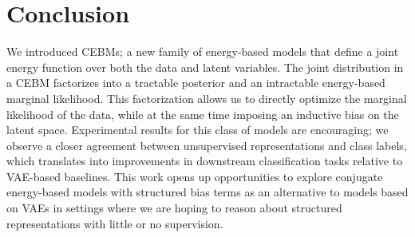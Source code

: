\documentclass{article}
\begin{document}
\section{Conclusion}
\label{sec:conclusion}


We introduced CEBMs; a new family of energy-based models that define a joint energy function over both the data and latent variables. The joint distribution in a CEBM factorizes into a tractable posterior and an intractable energy-based marginal likelihood. This factorization allows us to directly optimize the marginal likelihood of the data, while at the same time imposing an inductive bias on the latent space. Experimental results for this class of models are encouraging; we observe a closer agreement between unsupervised representations and class labels, which translates into improvements in downstream classification tasks relative to VAE-based baselines. This work opens up opportunities to explore conjugate energy-based models with structured bias terms as an alternative to models based on VAEs in settings where we are hoping to reason about structured representations with little or no supervision. 





\end{document}
